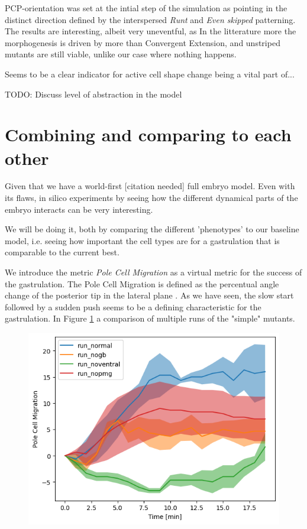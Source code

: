 PCP-orientation was set at the intial step of the simulation as pointing in the distinct direction defined by the interspersed \textit{Runt} and \textit{Even skipped} patterning.
The results are interesting, albeit very uneventful, as
In the litterature  \cite{butler2009cell} more the morphogenesis is driven by more than Convergent Extension, and unstriped mutants are still viable, unlike our case where nothing happens.

Seems to be a clear indicator for active cell shape change being a vital part of... 

TODO: Discuss level of abstraction in the model 

\section{Combining and comparing to each other}
Given that we have a world-first [citation needed] full embryo model. Even with its flaws, in silico experiments by seeing how the different dynamical parts of the embryo interacts can be very interesting. 

We will be doing it, both by comparing the different 'phenotypes' to our baseline model, i.e. seeing how important the cell types are for a gastrulation that is comparable to the current best.

We introduce the metric \textit{Pole Cell Migration} as a virtual metric for the success of the gastrulation. The Pole Cell Migration is defined as the percentual angle change of the posterior tip in the lateral plane . As we have seen, the slow start followed by a sudden push seems to be a defining characteristic for the gastrulation. In Figure \ref{fig:PCM-mutants} a comparison of multiple runs of the "simple" mutants. 

\begin{figure}[H]
    \centering
    \includegraphics[width=1.\linewidth]{chapters/Results/figures/compare_PCM.png}
    \caption{}
    \label{fig:PCM-mutants}
\end{figure}

